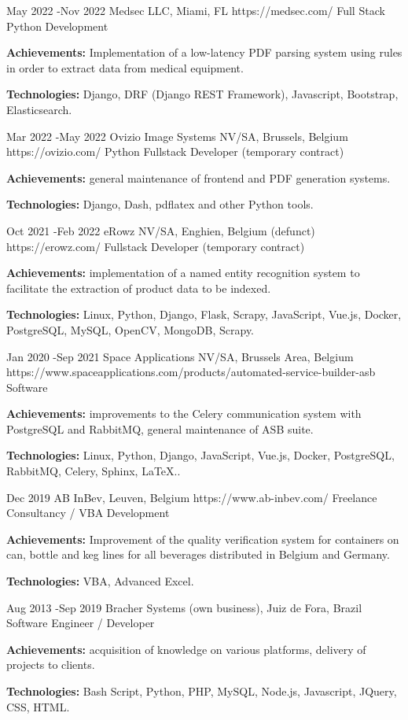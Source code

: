 \documentclass[10pt]{article} %
\begin{document}
\job
{May 2022 -}{Nov 2022}
{Medsec LLC, Miami, FL}
{https://medsec.com/}
{Full Stack Python Development}
{\rule{0mm}{2mm}\textbf{Achievements:} Implementation of a low-latency PDF parsing system using rules in order to extract data from medical equipment.\\
\rule{0mm}{3mm}\textbf{Technologies:} Django, DRF (Django REST Framework), Javascript, Bootstrap, Elasticsearch.}

\job
{Mar 2022 -}{May 2022}
{Ovizio Image Systems NV/SA, Brussels, Belgium}
{https://ovizio.com/}
{Python Fullstack Developer (temporary contract)}
{\rule{0mm}{2mm}\textbf{Achievements:} general maintenance of frontend and PDF generation systems.\\
\rule{0mm}{3mm}\textbf{Technologies:} Django, Dash, pdflatex and other Python tools.}

\job
{Oct 2021 -}{Feb 2022}
{eRowz  NV/SA, Enghien, Belgium (defunct)}
{https://erowz.com/}
{Fullstack Developer (temporary contract)}
{\rule{0mm}{2mm}\textbf{Achievements:} implementation of a named entity recognition system to facilitate the extraction of product data to be indexed.\\
\rule{0mm}{3mm}\textbf{Technologies:} Linux, Python, Django, Flask, Scrapy, JavaScript, Vue.js, Docker, PostgreSQL, MySQL, OpenCV, MongoDB, Scrapy.}

\job
{Jan 2020 -}{Sep 2021}
{Space Applications NV/SA, Brussels Area, Belgium}
{https://www.spaceapplications.com/products/automated-service-builder-asb}
{Software }
{\rule{0mm}{2mm}\textbf{Achievements:} improvements to the Celery communication system with PostgreSQL and RabbitMQ, general maintenance of ASB suite.\\
\rule{0mm}{3mm}\textbf{Technologies:} Linux, Python, Django, JavaScript, Vue.js, Docker, PostgreSQL, RabbitMQ, Celery, Sphinx, LaTeX..}

\job
{Dec 2019}{}
{AB InBev, Leuven, Belgium}
{https://www.ab-inbev.com/}
{Freelance Consultancy / VBA Development}
{\rule{0mm}{2mm}\textbf{Achievements:} Improvement of the quality verification system for containers on can, bottle and keg lines for all beverages distributed in Belgium and Germany.\\
\rule{0mm}{3mm}\textbf{Technologies:} VBA, Advanced Excel.}

\job
{Aug 2013 -}{Sep 2019}
{Bracher Systems (own business), Juiz de Fora, Brazil}
{}
{Software Engineer / Developer}
{\rule{0mm}{2mm}\textbf{Achievements:} acquisition of knowledge on various platforms, delivery of projects to clients.\\
\rule{0mm}{3mm}\textbf{Technologies:} Bash Script, Python, PHP, MySQL, Node.js, Javascript, JQuery, CSS, HTML.}
\end{document}
